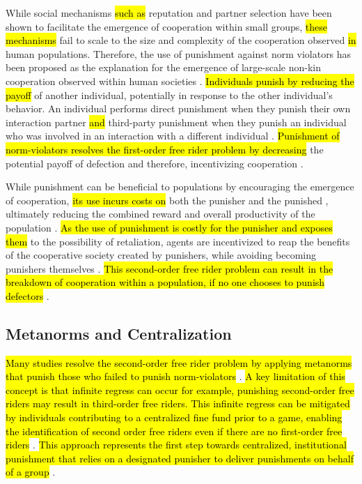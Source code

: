 \documentclass[sn-aps,numbered]{sn-jnl}%
\theoremstyle{thmstyleone}%
\theoremstyle{thmstyletwo}%
\theoremstyle{thmstylethree}%
\begin{document}
While social mechanisms \hl{such as} reputation and partner selection have been shown to facilitate the emergence of cooperation within small groups, \hl{these mechanisms} fail to scale to the size and complexity of the cooperation observed \hl{in} human populations. Therefore, the use of punishment against norm violators has been proposed as the explanation for the emergence of large-scale non-kin cooperation observed within human societies \citep{Redhead2021, silly_rules_ssd, coop_sizes_punish_partner_choice_rep, boyd1992punishment, tpp_4_year_olds, second_or_third_baumard}. \hl{Individuals punish by reducing the payoff} of another individual, potentially in response to the other individual's behavior. An individual performs direct punishment when they punish their own interaction partner \hl{and} third-party punishment when they punish an individual who was involved in an interaction with a different individual \citep{Redhead2021, molho2020direct}. \hl{Punishment of norm-violators resolves the first-order free rider problem by decreasing} the potential payoff of defection and therefore, incentivizing cooperation \citep{Pleasant2018, coop_sizes_punish_partner_choice_rep, boyd1992punishment}. 

While punishment can be beneficial to populations by encouraging the emergence of cooperation, \hl{its use incurs costs on} both the punisher and the punished \citep{Redhead2021, Barclay2016}, ultimately reducing the combined reward and overall productivity of the population \citep{Raihani2015_tpp_rewarded_helpers, Dreber2008}. \hl{As the use of punishment is costly for the punisher and exposes them} to the possibility of retaliation, agents are incentivized to reap the benefits of the cooperative society created by punishers, while avoiding becoming punishers themselves \citep{Redhead2021, Raihani2015_tpp_rewarded_helpers, Dreber2008}. \hl{This second-order free rider problem can result in the breakdown of cooperation within a population, if no one chooses to punish defectors} \citep{punishment_counter_punishment_nikiforakis}.

\subsection{Metanorms and Centralization}

\hl{Many studies resolve the second-order free rider problem by applying metanorms} \citep{axelrod1986evolutionary} \hl{that punish those who failed to punish norm-violators} \citep{metapunishing, division_of_labour, SigmundSocialLearning}. \hl{A key limitation of this concept is that infinite regress can occur for example, punishing second-order free riders may result in third-order free riders. This infinite regress can be mitigated by individuals contributing to a centralized fine fund prior to a game, enabling the identification of second order free riders even if there are no first-order free riders} \citep{SigmundSocialLearning}. \hl{This approach represents the first step towards centralized, institutional punishment that relies on a designated punisher to deliver punishments on behalf of a group} \citep{Redhead2021}. 
\end{document}
